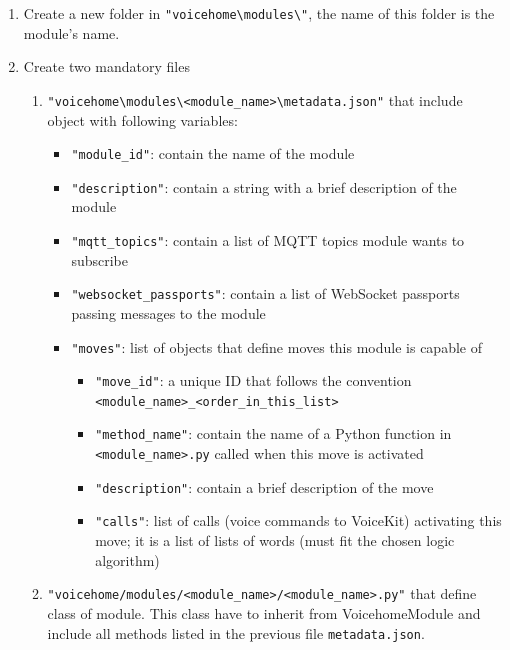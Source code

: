 \begin{enumerate}[label=\arabic*)]
    \item Create a new folder in \texttt{"voicehome\textbackslash modules\textbackslash "}, the name of this folder is the module's name.
    \item Create two mandatory files
    \begin{enumerate}
        \item \texttt{"voicehome\textbackslash modules\textbackslash <module\_name>\textbackslash metadata.json"} that include object with following variables:
        \begin{itemize}
            \item \texttt{"module\_id"}: contain the name of the module
            \item \texttt{"description"}: contain a string with a brief description of the module
            \item \texttt{"mqtt\_topics"}: contain a list of MQTT topics module wants to subscribe
            \item \texttt{"websocket\_passports"}: contain a list of WebSocket passports passing messages to the module
            \item \texttt{"moves"}: list of objects that define moves this module is capable of
            \begin{itemize}
                \item \texttt{"move\_id"}: a unique ID that follows the convention \texttt{<module\_name>\_<order\_in\_this\_list>}
                \item \texttt{"method\_name"}: contain the name of a Python function in \texttt{<module\_name>.py} called when this move is activated
                \item \texttt{"description"}: contain a brief description of the move
                \item \texttt{"calls"}: list of calls (voice commands to VoiceKit) activating this move; it is a list of lists of words (must fit the chosen logic algorithm)
            \end{itemize}
        \end{itemize}
        \item \texttt{"voicehome/modules/<module\_name>/<module\_name>.py"} that define class of module. This class have to inherit from VoicehomeModule and include all methods listed in the previous file \texttt{metadata.json}.
        
        
    \end{enumerate}
\end{enumerate}

